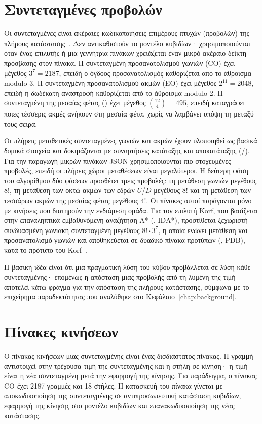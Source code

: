 \section{Συντεταγμένες προβολών}
\label{sec:model-coordinates}
Οι συντεταγμένες είναι ακέραιες κωδικοποιήσεις επιμέρους πτυχών (προβολών) της πλήρους κατάστασης~\cite{kociembaImplementationDetails}. Δεν αντικαθιστούν το μοντέλο κυβιδίων· χρησιμοποιούνται όταν ένας επιλυτής ή μια γεννήτρια πινάκων χρειάζεται έναν μικρό ακέραιο δείκτη πρόσβασης στον πίνακα. Η συντεταγμένη προσανατολισμού γωνιών (CO) έχει μέγεθος \(3^7=2187\), επειδή ο όγδοος προσανατολισμός καθορίζεται από το άθροισμα modulo 3. Η συντεταγμένη προσανατολισμού ακμών (EO) έχει μέγεθος \(2^{11}=2048\), επειδή η δωδέκατη αναστροφή καθορίζεται από το άθροισμα modulo 2. Η συντεταγμένη της μεσαίας φέτας () έχει μέγεθος \(\binom{12}{4}=495\), επειδή καταγράφει ποιες τέσσερις ακμές ανήκουν στη μεσαία φέτα, χωρίς να λαμβάνει υπόψη τη μεταξύ τους σειρά.

Οι πλήρεις μεταθετικές συντεταγμένες γωνιών και ακμών έχουν υλοποιηθεί ως βασικά δομικά στοιχεία και δοκιμάζονται με συναρτήσεις κατάταξης και αποκατάταξης (/). Για την παραγωγή μικρών πινάκων JSON χρησιμοποιούνται πιο στοχευμένες προβολές, επειδή οι πλήρεις χώροι μεταθέσεων είναι μεγαλύτεροι. Η δεύτερη φάση του αλγορίθμου δύο φάσεων προσθέτει τρεις προβολές: τη μετάθεση γωνιών μεγέθους \(8!\), τη μετάθεση των οκτώ ακμών των εδρών \(U\)/\(D\) μεγέθους \(8!\) και τη μετάθεση των τεσσάρων ακμών της μεσαίας φέτας μεγέθους \(4!\). Οι πίνακες αυτοί παράγονται μόνο με κινήσεις που διατηρούν την ενδιάμεση ομάδα. Για τον επιλυτή Korf, που βασίζεται στην επαναληπτικά εμβαθυνόμενη αναζήτηση A* (, IDA*), προστίθεται ξεχωριστή συνδυασμένη γωνιακή συντεταγμένη μεγέθους \(8!\cdot3^7\), η οποία ενώνει μετάθεση και προσανατολισμό γωνιών και αποθηκεύεται σε δυαδικό πίνακα προτύπων (, PDB), κατά το πρότυπο του Korf~\cite{korf1997pattern}.

Η βασική ιδέα είναι ότι μια πραγματική λύση του κύβου προβάλλεται σε λύση κάθε συντεταγμένης· επομένως η απόσταση μιας προβολής από τη λυμένη της τιμή αποτελεί κάτω φράγμα για την απόσταση της πλήρους κατάστασης, σύμφωνα με το επιχείρημα παραδεκτότητας που αναλύθηκε στο Κεφάλαιο~\ref{chap:background}.

\section{Πίνακες κινήσεων}
\label{sec:model-move-tables}
Ο πίνακας κινήσεων μιας συντεταγμένης είναι ένας δισδιάστατος πίνακας. Η γραμμή αντιστοιχεί στην τρέχουσα τιμή της συντεταγμένης και η στήλη σε κίνηση· η τιμή είναι η νέα συντεταγμένη μετά την εφαρμογή της κίνησης. Για παράδειγμα, ο πίνακας CO έχει 2187 γραμμές και 18 στήλες. Η κατασκευή του πίνακα γίνεται με αποκωδικοποίηση της συντεταγμένης σε αντιπροσωπευτική κατάσταση κυβιδίων, εφαρμογή της κίνησης στο μοντέλο κυβιδίων και επανακωδικοποίηση της νέας κατάστασης.

